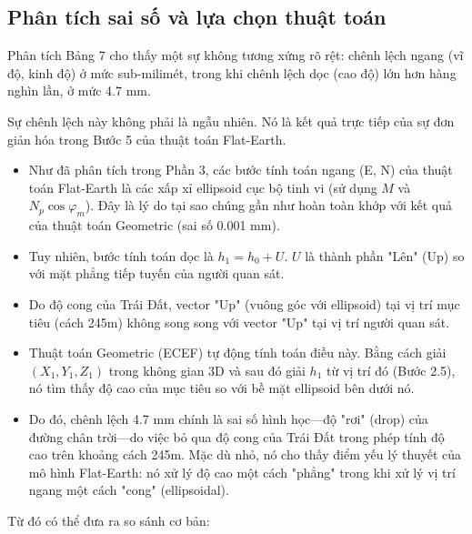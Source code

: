 \subsection{Phân tích sai số và lựa chọn thuật toán}
Phân tích Bảng 7 cho thấy một sự không tương xứng rõ rệt: chênh lệch ngang (vĩ độ, kinh độ) ở mức sub-milimét, trong khi chênh lệch dọc (cao độ) lớn hơn hàng nghìn lần, ở mức 4.7 mm.

Sự chênh lệch này không phải là ngẫu nhiên. Nó là kết quả trực tiếp của sự đơn giản hóa trong Bước 5 của thuật toán Flat-Earth.
\begin{itemize}
    \item Như đã phân tích trong Phần 3, các bước tính toán ngang (E, N) của thuật toán Flat-Earth là các xấp xỉ ellipsoid cục bộ tinh vi (sử dụng $M$ và $N_p \cos \varphi_m$). Đây là lý do tại sao chúng gần như hoàn toàn khớp với kết quả của thuật toán Geometric (sai số 0.001 mm).
    \item Tuy nhiên, bước tính toán dọc là $h_1 = h_0 + U$. $U$ là thành phần "Lên" (Up) so với mặt phẳng tiếp tuyến của người quan sát.
    \item Do độ cong của Trái Đất, vector "Up" (vuông góc với ellipsoid) tại vị trí mục tiêu (cách 245m) không song song với vector "Up" tại vị trí người quan sát.
    \item Thuật toán Geometric (ECEF) tự động tính toán điều này. Bằng cách giải $(X_1, Y_1, Z_1)$ trong không gian 3D và sau đó giải $h_1$ từ vị trí đó (Bước 2.5), nó tìm thấy độ cao của mục tiêu so với bề mặt ellipsoid bên dưới nó.
    \item Do đó, chênh lệch 4.7 mm chính là sai số hình học—độ "rơi" (drop) của đường chân trời—do việc bỏ qua độ cong của Trái Đất trong phép tính độ cao trên khoảng cách 245m. Mặc dù nhỏ, nó cho thấy điểm yếu lý thuyết của mô hình Flat-Earth: nó xử lý độ cao một cách "phẳng" trong khi xử lý vị trí ngang một cách "cong" (ellipsoidal).
\end{itemize}

Từ đó có thể đưa ra so sánh cơ bản:

